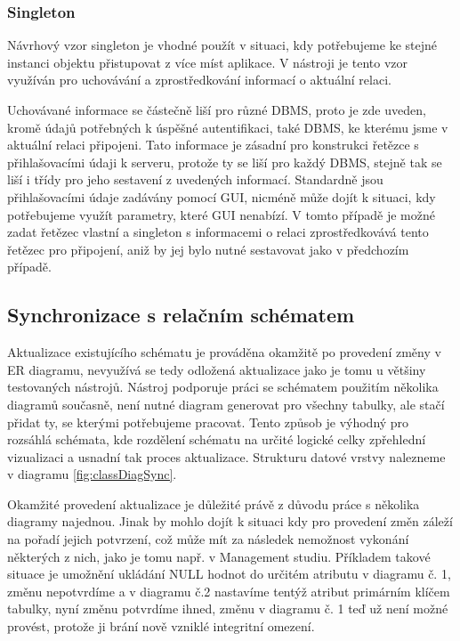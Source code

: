 \documentclass[czech,bachelor,public,dept460,male,oneside]{diploma}
\begin{document}
		\subsubsection{Singleton}
		Návrhový vzor singleton je vhodné použít v situaci, kdy potřebujeme ke stejné instanci objektu přistupovat z více míst aplikace. V nástroji je tento vzor využíván pro uchovávání a zprostředkování informací o aktuální relaci. 
		
		Uchovávané informace se částečně liší pro různé DBMS, proto je zde uveden, kromě údajů potřebných k úspěšné autentifikaci, také DBMS, ke kterému jsme v aktuální relaci připojeni. Tato informace je zásadní pro konstrukci řetězce s přihlašovacími údaji k serveru, protože ty se liší pro každý DBMS, stejně tak se liší i třídy pro jeho sestavení z uvedených informací. Standardně jsou přihlašovacími údaje zadávány pomocí GUI, nicméně může dojít k situaci, kdy potřebujeme využít parametry, které GUI nenabízí. V tomto případě je možné zadat řetězec vlastní a singleton s informacemi o relaci zprostředkovává tento řetězec pro připojení, aniž by jej bylo nutné sestavovat jako v předchozím případě.
		
	\subsection{Synchronizace s relačním schématem}
	Aktualizace existujícího schématu je prováděna okamžitě po provedení změny v ER diagramu, nevyužívá se tedy odložená aktualizace jako je tomu u většiny testovaných nástrojů. Nástroj podporuje práci se schématem použitím několika diagramů současně, není nutné diagram generovat pro všechny tabulky, ale stačí přidat ty, se kterými potřebujeme pracovat. Tento způsob je výhodný pro rozsáhlá schémata, kde rozdělení schématu na určité logické celky zpřehlední vizualizaci a usnadní tak proces aktualizace. Strukturu datové vrstvy nalezneme v diagramu \ref{fig:classDiagSync}.
	
	Okamžité provedení aktualizace je důležité právě z důvodu práce s několika diagramy najednou. Jinak by mohlo dojít k situaci kdy pro provedení změn záleží na pořadí jejich potvrzení, což může mít za následek nemožnost vykonání některých z nich, jako je tomu např. v Management studiu. Příkladem takové situace je umožnění ukládání NULL hodnot do určitém atributu v diagramu č. 1, změnu nepotvrdíme a v diagramu č.2 nastavíme tentýž atribut primárním klíčem tabulky, nyní změnu potvrdíme ihned, změnu v diagramu č. 1 teď už není možné provést, protože ji brání nově vzniklé integritní omezení.
	
\end{document}
